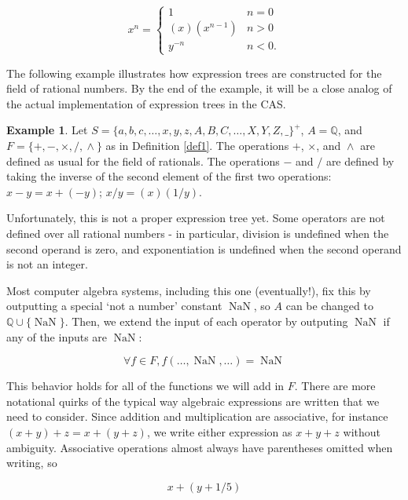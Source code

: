 \documentclass{article}
\theoremstyle{definition}
\newtheorem{exa}[thm]{Example}
\DeclareMathOperator{\pow}{\wedge}
\DeclareMathOperator{\NaN}{NaN}
\begin{document}
\begin{equation*}
    x^n = \begin{cases} 1 & n = 0\\
                (x)(x^{n-1}) & n > 0\\
                y^{-n} & n < 0.
                \end{cases}
\end{equation*}

The following example illustrates how expression trees are constructed for the field of rational numbers. By the end of the example, it will be a close analog of the actual implementation of expression trees in the CAS.

\begin{exa} \label{exa1}
    Let $S = \{a, b, c, \ldots, x, y, z, A, B, C, \ldots, X, Y, Z, \_\}^+$, $A = \mathbb{Q}$, and $F = \{+, - , \times, /, \pow\}$ as in Definition \ref{def1}. The operations $+$, $\times$, and $\pow$ are defined as usual for the field of rationals. The operations $-$ and $/$ are defined by taking the inverse of the second element of the first two operations: $x - y = x + (-y)$; $x / y = (x)(1/y)$.
    
    Unfortunately, this is not a proper expression tree yet. Some operators are not defined over all rational numbers - in particular, division is undefined when the second operand is zero, and exponentiation is undefined when the second operand is not an integer. 
    
    Most computer algebra systems, including this one (eventually!), fix this by outputting a special `not a number' constant $\NaN$, so $A$ can be changed to $\mathbb{Q} \cup \{\NaN\}$. Then, we extend the input of each operator by outputing $\NaN$ if any of the inputs are $\NaN$:
    
    \begin{equation*}
        \forall f \in F, f(\ldots,\NaN,\ldots) = \NaN
    \end{equation*}
    
    This behavior holds for all of the functions we will add in $F$. There are more notational quirks of the typical way algebraic expressions are written that we need to consider. Since addition and multiplication are associative, for instance $(x+y)+z = x+(y+z)$, we write either expression as $x+y+z$ without ambiguity. Associative operations almost always have parentheses omitted when writing, so
    
    \begin{equation*}
        x + (y + 1/5)
    \end{equation*}
    

\end{exa}
\end{document}
